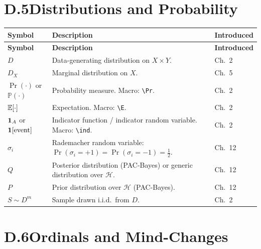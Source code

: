 \section*{D.5\quad Distributions and Probability}
\label{sec:notation-prob}

\begin{longtable}{lp{7.5cm}l}
\toprule
\textbf{Symbol} & \textbf{Description} & \textbf{Introduced} \\
\midrule
\endfirsthead
\toprule
\textbf{Symbol} & \textbf{Description} & \textbf{Introduced} \\
\midrule
\endhead
\bottomrule
\endlastfoot
$D$ & Data-generating distribution on $X \times Y$. & Ch.~2 \\
$D_X$ & Marginal distribution on $X$. & Ch.~5 \\
$\Pr(\cdot)$ or $\mathbb{P}(\cdot)$ & Probability measure. Macro: \verb|\Pr|. & Ch.~2 \\
$\mathbb{E}[\cdot]$ & Expectation. Macro: \verb|\E|. & Ch.~2 \\
$\mathbf{1}_A$ or $\mathbf{1}[\text{event}]$ & Indicator function / indicator random variable. Macro: \verb|\ind|. & Ch.~2 \\
$\sigma_i$ & Rademacher random variable: $\Pr(\sigma_i = +1) = \Pr(\sigma_i = -1) = \tfrac{1}{2}$. & Ch.~12 \\
$Q$ & Posterior distribution (PAC-Bayes) or generic distribution over $\mathcal{H}$. & Ch.~12 \\
$P$ & Prior distribution over $\mathcal{H}$ (PAC-Bayes). & Ch.~12 \\
$S \sim D^m$ & Sample drawn i.i.d.\ from $D$. & Ch.~2 \\
\end{longtable}

\section*{D.6\quad Ordinals and Mind-Changes}
\label{sec:notation-ordinals}

